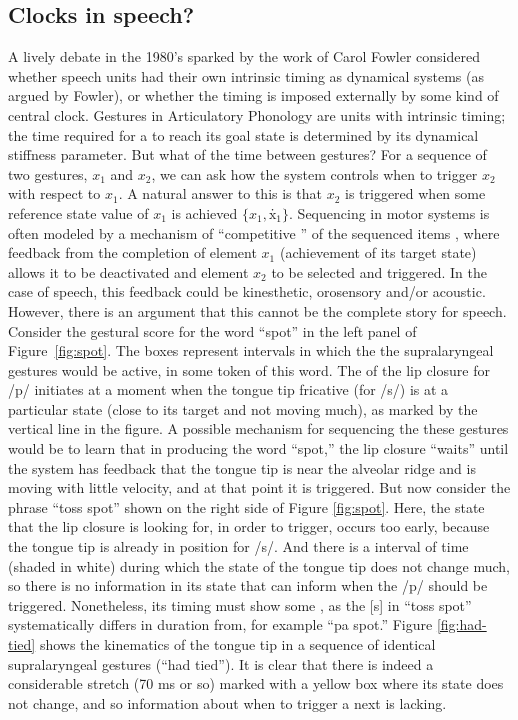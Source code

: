 \documentclass[output=paper,
modfonts
]{LSP/langsci}
\begin{document}
\subsection{Clocks in speech?}
A lively debate in the 1980's sparked by the work of Carol Fowler \citep{Fowler80} considered whether speech units had their own intrinsic timing as dynamical systems (as argued by Fowler), or whether the timing is imposed externally by some kind of central clock. Gestures in Articulatory Phonology are units with intrinsic timing; the time required for a  to reach its goal state is determined by its dynamical stiffness parameter. But what of the time between gestures? For a sequence of two gestures, $x{_1}$ and $x{_2}$, we can ask how the system controls when to trigger $x{_2}$ with respect to $x{_1}$. A natural answer to this is that $x{_2}$ is triggered when some reference state value of $x{_1}$ is achieved $\{x{_1}, {ẋ{_1}}\}$. Sequencing in motor systems is often modeled by a mechanism of ``competitive '' of the sequenced items \citep{Bullock2002,Grossberg78}, where feedback from the completion of element $x{_1}$ (achievement of its target state) allows it to be deactivated and element $x{_2}$ to be selected and triggered.  In the case of speech, this feedback could be kinesthetic, orosensory and/or acoustic. However, there is an argument that this cannot be the complete story for speech. Consider the gestural score for the word ``spot'' in the left panel of Figure~\ref{fig:spot}. The boxes represent intervals in which the the supralaryngeal gestures would be active, in some token of this word. The  of the lip closure for /p/ initiates at a moment when the tongue tip fricative  (for /s/) is at a particular state (close to its target and not moving much), as marked by the vertical line in the figure. A possible mechanism for sequencing the these gestures would be to learn that in producing the word ``spot,'' the lip closure  ``waits'' until the system has feedback that the tongue tip is near the alveolar ridge and is moving with little velocity, and at that point it is triggered.   But now consider the phrase ``toss spot'' shown on the right side of Figure \ref{fig:spot}. Here, the state that the lip closure is looking for, in order to trigger, occurs too early, because the tongue tip is already in position for /s/. And there is a interval of time (shaded in white) during which the state of the tongue tip does not change much, so there is no information in its state that can inform when the /p/ should be triggered. Nonetheless, its timing must show some , as the [s] in ``toss spot'' systematically differs in duration from, for example ``pa spot.'' Figure \ref{fig:had-tied} shows the kinematics of the tongue tip in a sequence of identical supralaryngeal gestures (``had tied'').  It is clear that there is indeed a considerable stretch (70 ms or so) marked with a yellow box  where its state does not change, and so information about when to trigger a next  is lacking. 
\end{document}
